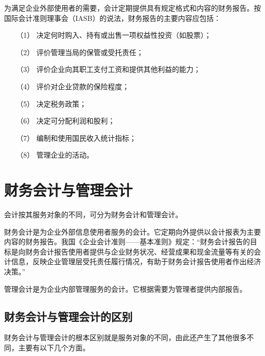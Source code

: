\begin{enumerate}
\begin{enumerate}
						\end{enumerate}
						为满足企业外部使用者的需要，会计定期提供具有规定格式和内容的财务报告。按国际会计准则理事会（IASB）的说法，财务报告的主要内容应包括：
						\begin{enumerate}
							\item[（1）] 决定何时购入、持有或出售一项权益性投资（如股票）；
							\item[（2）] 评价管理当局的保管或受托责任；
							\item[（3）] 评价企业向其职工支付工资和提供其他利益的能力；
							\item[（4）] 评价对企业贷款的保险程度；
							\item[（5）] 决定税务政策；
							\item[（6）] 决定可分配利润和股利；
							\item[（7）] 编制和使用国民收入统计指标；
							\item[（8）] 管理企业的活动。
						\end{enumerate}
		\end{enumerate}

		\section{财务会计与管理会计}

		会计按其服务对象的不同，可分为财务会计和管理会计。

		财务会计是为企业外部信息使用者服务的会计。它定期向外提供以会计报表为主要内容的财务报告。我国《企业会计准则——基本准则》规定：“财务会计报告的目标是向财务会计报告使用者提供与企业财务状况、经营成果和现金流量等有关的会计信息，反映企业管理层受托责任履行情况，有助于财务会计报告使用者作出经济决策。”

		管理会计是为企业内部管理服务的会计。它根据需要为管理者提供内部报告。

		\subsection{财务会计与管理会计的区别}

		财务会计与管理会计的根本区别就是服务对象的不同，由此还产生了其他很多不同，主要有以下几个方面。
		
